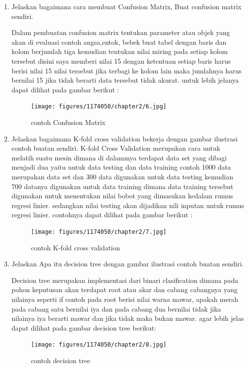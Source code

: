 \begin{enumerate}
\item Jelaskan bagaimana cara membuat Confusion Matrix, Buat confusion matrix sendiri.\par
Dalam pembuatan confusion matrix tentukan parameter atau objek yang akan di evaluasi contoh angsa,entok, bebek buat tabel dengan baris dan kolom berjumlah tiga kemudian tentukan nilai miring pada setiap kolom tersebut disini saya memberi nilai 15 dengan ketentuan setiap baris harus berisi nilai 15 nilai tersebut jika terbagi ke kolom lain maka jumlahnya harus bernilai 15 jika tidak berarti data tersebut tidak akurat. untuk lebih jelanya dapat dilihat pada gambar berikut :
\begin{figure}[ht]
\centering
\texttt{[image: figures/1174050/chapter2/6.jpg]}
\caption{contoh Confusion Matrix}
\label{contoh}
\end{figure}


\item Jelaskan bagaimana K-fold cross validation bekerja dengan gambar ilustrasi contoh buatan sendiri.
K-fold Cross Validation merupakan cara untuk melatih suatu mesin dimana di dalammya terdapat data set yang dibagi menjadi dua yaitu untuk data testing dan data training contoh 1000 data merupakan data set dan 300 data digunakan untuk data testing kemudian 700 datanya digunakan untuk data training dimana data training tersebut digunakan untuk menentukan nilai bobot yang dimasukan kedalam rumus regresi linier. sedangkan nilai testing akan dijadikan nili inputan untuk rumus regresi linier. contohnya dapat dilihat pada gambar berikut :
\begin{figure}[ht]
\centering
\texttt{[image: figures/1174050/chapter2/7.jpg]}
\caption{contoh K-fold cross validation}
\label{contoh}
\end{figure}


\item Jelaskan Apa itu decision tree dengan gambar ilustrasi contoh buatan sendiri.\par
Decision tree merupakan implementasi dari binari clasification dimana pada pohon keputusan akan terdapat root atau akar dan cabang cabangnya yang nilainya seperti if contoh pada root berisi nilai warna mawar, apakah merah pada cabang satu bernilai iya dan pada cabang dua bernilai tidak jika nilainya iya berarti mawar dan jika tidak maka bukan mawar.
agar lebih jelas dapat dilihat pada gambar decision tree berikut:
\begin{figure}[ht]
\centering
\texttt{[image: figures/1174050/chapter2/8.jpg]}
\caption{contoh decision tree}
\label{contoh}
\end{figure}



\end{enumerate}
